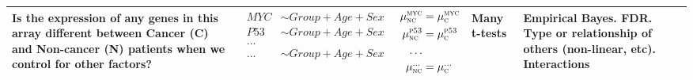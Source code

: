 \begin{frame}
\begin{textblock*}{153mm}
\begin{tabular}{>{\centering}m{2.92cm} c c p{1.0cm} m{1.92cm}}
Is the expression of any genes in this array different between Cancer (C) and Non-cancer
(N) patients when we control for other factors?&
$\begin{aligned}
MYC & \sim Group + Age + Sex\\
P53 & \sim Group + Age + Sex\\
\ldots& \\
\ldots & \sim Group + Age + Sex
\end{aligned}$
&
$\begin{aligned} \mu_{\textsc{nc}}^{\textsc{myc}} & = \mu_{\textsc{c}}^{\textsc{myc}}\\
\mu_{\textsc{nc}}^{\textsc{p53}} & = \mu_{\textsc{c}}^{\textsc{p53}}\\
\ldots & \\
\mu_{\textsc{nc}}^{\ldots} & = \mu_{\textsc{c}}^{\ldots}
\end{aligned}$
&Many t-tests & Empirical Bayes. FDR. {\tiny Type or relationship of others (non-linear, etc). Interactions}\\
\hline
\end{tabular}
\end{textblock*}
\end{frame}

